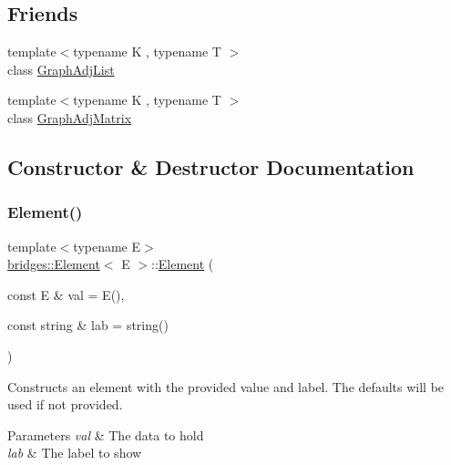 \subsection*{Friends}
\begin{DoxyCompactItemize}
\item 
{\footnotesize template$<$typename K , typename T $>$ }\\class \hyperlink{classbridges_1_1_element_a1ec5df26ff2381673c41d5a8d1f222e2}{Graph\+Adj\+List}
\item 
{\footnotesize template$<$typename K , typename T $>$ }\\class \hyperlink{classbridges_1_1_element_ae8ba4af32b14c8ac8a3f8f861e914444}{Graph\+Adj\+Matrix}
\end{DoxyCompactItemize}


\subsection{Constructor \& Destructor Documentation}
\hypertarget{classbridges_1_1_element_abc7131584142ea48faf3b7a8033d1fef}{}\label{classbridges_1_1_element_abc7131584142ea48faf3b7a8033d1fef} 
\subsubsection{\texorpdfstring{Element()}{Element()}}
{\footnotesize\ttfamily template$<$typename E$>$ \\
\hyperlink{classbridges_1_1_element}{bridges\+::\+Element}$<$ E $>$\+::\hyperlink{classbridges_1_1_element}{Element} (\begin{DoxyParamCaption}\item[{const E \&}]{val = {\ttfamily E()},  }\item[{const string \&}]{lab = {\ttfamily string()} }\end{DoxyParamCaption})\hspace{0.3cm}{\ttfamily [inline]}}

Constructs an element with the provided value and label. The defaults will be used if not provided.


\begin{DoxyParams}{Parameters}
{\em val} & The data to hold \\
\hline
{\em lab} & The label to show \\
\hline
\end{DoxyParams}


